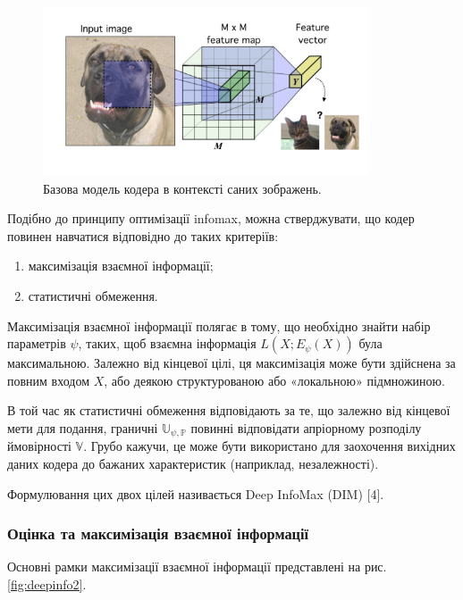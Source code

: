 \begin{figure}[h]
  \includegraphics[width=\textwidth, height=5cm, natwidth=277, natheight=144]{Mal/deepinfo1.jpg}
  \caption{Базова модель кодера в контексті саних зображень.}
  \label{fig:deepinfo1}
\end{figure}

Подібно до принципу оптимізації infomax, можна стверджувати, що кодер повинен навчатися відповідно до таких критеріїв:

\begin{enumerate}
	\item максимізація взаємної інформації; 
	\item статистичні обмеження. 
\end{enumerate}


Максимізація взаємної інформації полягає в тому, що необхідно знайти набір параметрів $\psi$, таких, щоб взаємна інформація $L(X; E_{\psi} (X))$ була максимальною. Залежно від кінцевої цілі, ця максимізація може бути здійснена за повним входом $X$, або деякою структурованою або «локальною» підмножиною.

В той час як статистичні обмеження відповідають за те, що залежно від кінцевої мети для подання, граничні $\mathbb{U}_{\psi, \mathbb{P}}$ повинні відповідати апріорному розподілу ймовірності $\mathbb{V}$. Грубо кажучи, це може бути використано для заохочення вихідних даних кодера до бажаних характеристик (наприклад, незалежності).

Формулювання цих двох цілей називається Deep InfoMax (DIM) [4].

\subsubsection{Оцінка та максимізація взаємної інформації}

Основні рамки максимізації взаємної інформації представлені на рис. \ref{fig:deepinfo2}. 

\vspace{1em}

